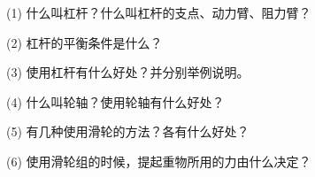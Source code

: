 \label{sec:7-fuxi}

(1) 什么叫杠杆？什么叫杠杆的支点、动力臂、阻力臂？

(2) 杠杆的平衡条件是什么？

(3) 使用杠杆有什么好处？并分别举例说明。

(4) 什么叫轮轴？使用轮轴有什么好处？

(5) 有几种使用滑轮的方法？各有什么好处？

(6) 使用滑轮组的时候，提起重物所用的力由什么决定？


